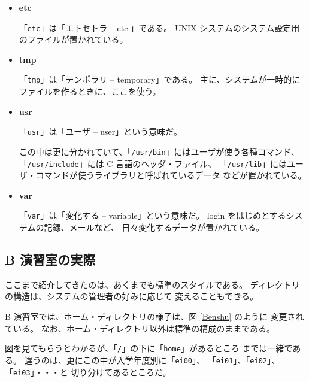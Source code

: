 \begin{itemize}
「\texttt{bin}」というのは「バイナリ -- binary」の略で、
本来は文字ではないデータが入っているファイルのことを意味する
\footnote{マシン語で書かれたコマンドや、画像、音声データなどが、
本来の意味ではバイナリである}。

\item \textbf{\large etc}

「\texttt{etc}」は「エトセトラ -- etc.」である。
 UNIX システムのシステム設定用のファイルが置かれている。

\item \textbf{\large tmp}

「\texttt{tmp}」は「テンポラリ -- temporary」である。
主に、システムが一時的にファイルを作るときに、ここを使う。

\item \textbf{\large usr}

「\texttt{usr}」は「ユーザ -- user」という意味だ。

この中は更に分かれていて、「\texttt{/usr/bin}」にはユーザが使う各種コマンド、
「\texttt{/usr/include}」には C 言語のヘッダ・ファイル、
「\texttt{/usr/lib}」にはユーザ・コマンドが使うライブラリと呼ばれているデータ
などが置かれている。

\item \textbf{\large var}

「\texttt{var}」は「変化する -- variable」という意味だ。
 login をはじめとするシステムの記録、メールなど、
日々変化するデータが置かれている。
\end{itemize}

\newpage

\subsection{B 演習室の実際}

ここまで紹介してきたのは、あくまでも標準のスタイルである。
ディレクトリの構造は、システムの管理者の好みに応じて
変えることもできる。

\bigskip

B 演習室では、ホーム・ディレクトリの様子は、図 \ref{Benshu} のように
変更されている。
なお、ホーム・ディレクトリ以外は標準の構成のままである。

図を見てもらうとわかるが、「\texttt{/}」の下に「\texttt{home}」があるところ
までは一緒である。
違うのは、更にこの中が入学年度別に「\texttt{ei00}」、
「\texttt{ei01}」、「\texttt{ei02}」、「\texttt{ei03}」・・・と
切り分けてあるところだ。

\bigskip

